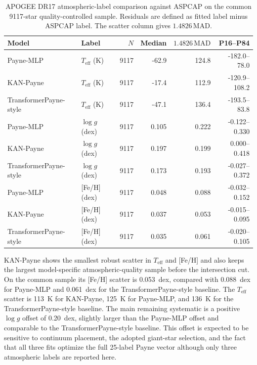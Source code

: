 \documentclass[universe,article,submit,pdftex,moreauthors]{Definitions/mdpi}
\begin{document}
\begin{table}[H]
\centering
\small
\caption{APOGEE DR17 atmospheric-label comparison against ASPCAP on the common
9117-star quality-controlled sample. Residuals are defined as fitted label
minus ASPCAP label. The scatter column gives $1.4826\,\mathrm{MAD}$.}
\label{tab:apogee-inference}
\begin{tabular}{llrrrr}
\toprule
Model & Label & $N$ & Median & $1.4826\,\mathrm{MAD}$ & P16--P84 \\
\midrule
Payne-MLP & $T_{\mathrm{eff}}$ (K) & 9117 & -62.9 & 124.8 & -182.0--78.0 \\
KAN-Payne & $T_{\mathrm{eff}}$ (K) & 9117 & -17.4 & 112.9 & -120.9--108.2 \\
TransformerPayne-style & $T_{\mathrm{eff}}$ (K) & 9117 & -47.1 & 136.4 & -193.5--83.8 \\
Payne-MLP & $\log g$ (dex) & 9117 & 0.105 & 0.222 & -0.122--0.330 \\
KAN-Payne & $\log g$ (dex) & 9117 & 0.197 & 0.199 & 0.000--0.418 \\
TransformerPayne-style & $\log g$ (dex) & 9117 & 0.173 & 0.193 & -0.027--0.372 \\
Payne-MLP & [Fe/H] (dex) & 9117 & 0.048 & 0.088 & -0.032--0.152 \\
KAN-Payne & [Fe/H] (dex) & 9117 & 0.037 & 0.053 & -0.015--0.095 \\
TransformerPayne-style & [Fe/H] (dex) & 9117 & 0.035 & 0.061 & -0.020--0.105 \\
\bottomrule
\end{tabular}
\end{table}

KAN-Payne shows the smallest robust scatter in $T_{\mathrm{eff}}$ and [Fe/H]
and also keeps the largest model-specific atmospheric-quality sample before the
intersection cut. On the common sample its [Fe/H] scatter is 0.053~dex,
compared with 0.088~dex for Payne-MLP and 0.061~dex for the
TransformerPayne-style baseline. The
$T_{\mathrm{eff}}$ scatter is 113~K for KAN-Payne, 125~K for Payne-MLP, and
136~K for the TransformerPayne-style baseline. The main remaining systematic is
a positive
$\log g$ offset of 0.20~dex, slightly larger than the Payne-MLP offset and
comparable to the TransformerPayne-style baseline. This offset is expected to
be sensitive to
continuum placement, the adopted giant-star selection, and the fact that all
three fits optimize the full 25-label Payne vector although only three
atmospheric labels are reported here.
\end{document}
